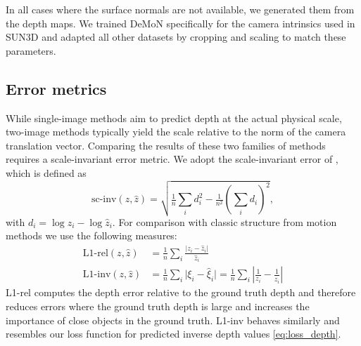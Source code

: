 \documentclass[10pt,twocolumn,letterpaper]{article}
\begin{document}
In all cases where the surface normals are not available, we generated them from the depth maps.
We trained DeMoN specifically for the camera intrinsics used in SUN3D and adapted all other datasets by cropping and scaling to match these parameters.

\subsection{Error metrics}
While single-image methods aim to predict depth at the actual physical scale, two-image methods typically yield the scale relative to the norm of the camera translation vector.
Comparing the results of these two families of methods requires a scale-invariant error metric.
We adopt the scale-invariant error of \cite{eigen_predicting_2014}, which is defined as
\begin{equation}
\textstyle \text{sc-inv}(z,\hat{z}) = \sqrt{\tfrac{1}{n}\sum_i d_i^2 - \tfrac{1}{n^2} \left(\sum_i d_i\right)^2},
\end{equation}
with $ d_i = \log z_i - \log \hat{z}_i$.
For comparison with classic structure from motion methods we use the following measures:
\begin{align}
\text{L1-rel}(z,\hat{z}) &= \tfrac{1}{n} \textstyle{\sum_i} \frac{\vert z_i - \hat{z}_i\vert}{\hat{z}_i}\\
\text{L1-inv}(z,\hat{z}) &= \tfrac{1}{n} \textstyle{\sum_i} \vert \xi_i - \hat{\xi}_i\vert = \tfrac{1}{n} \textstyle{\sum_i} \left\vert \frac{1}{z_i} - \frac{1}{\hat{z}_i}\right\vert 
\end{align}
L1-rel computes the depth error relative to the ground truth depth and therefore reduces errors where the ground truth depth is large and increases the importance of close objects in the ground truth.
L1-inv behaves similarly and resembles our loss function for predicted inverse depth values \eqref{eq:loss_depth}.
\end{document}
